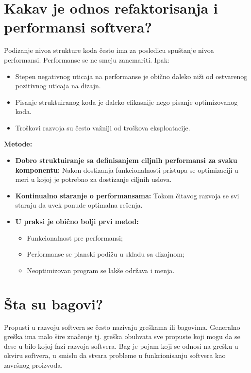 \documentclass[a4paper]{article}
\begin{document}
\section{Kakav je odnos refaktorisanja i performansi softvera?}
  Podizanje nivoa strukture koda često ima za posledicu spuštanje nivoa performansi. Performanse
  se ne smeju zanemariti. Ipak:
  \begin{itemize}
    \item Stepen negativnog uticaja na performanse je obično daleko niži od ostvarenog pozitivnog
          uticaja na dizajn.
    \item Pisanje struktuiranog koda je daleko efikasnije nego pisanje optimizovanog koda.
    \item Troškovi razvoja su često važniji od troškova eksploatacije.
  \end{itemize}
  \textbf{Metode:}
  \begin{itemize}
    \item \textbf{Dobro struktuiranje sa definisanjem ciljnih performansi za svaku komponentu:}
          Nakon dostizanja funkcionalnosti pristupa se optimizaciji u meri u kojoj je 
          potrebno za dostizanje ciljnih uslova.
    \item \textbf{Kontinualno staranje o performansama:} Tokom čitavog razvoja se svi staraju da 
          uvek ponude optimalna rešenja.
    \item \textbf{U praksi je obično bolji prvi metod:}
          \begin{itemize}
            \item Funkcionalnost pre performansi;
            \item Performanse se planski podižu u skladu sa dizajnom;
            \item Neoptimizovan program se lakše održava i menja.
          \end{itemize}
  \end{itemize}

\section{Šta su bagovi?}
  Propusti u razvoju softvera se često nazivaju greškama ili bagovima. Generalno greška ima malo šire
  značenje tj. greška obuhvata sve propuste koji mogu da se dese u bilo kojoj fazi razvoja softvera.
  Bag je pojam koji se odnosi na grešku u okviru softvera, u smislu da stvara probleme u
  funkcionisanju softvera kao završnog proizvoda. 
\end{document}
